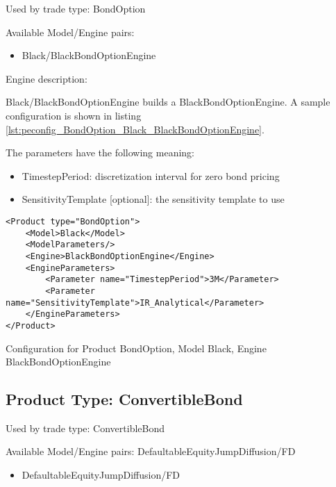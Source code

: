 Used by trade type: BondOption

Available Model/Engine pairs:

\begin{itemize}
\item Black/BlackBondOptionEngine
\end{itemize}

Engine description:

Black/BlackBondOptionEngine builds a BlackBondOptionEngine. A sample configuration is shown in listing
\ref{lst:peconfig_BondOption_Black_BlackBondOptionEngine}.

The parameters have the following meaning:

\begin{itemize}
\item TimestepPeriod: discretization interval for zero bond pricing
\item SensitivityTemplate [optional]: the sensitivity template to use 
\end{itemize}

\begin{longlisting}
\begin{verbatim}
<Product type="BondOption">
    <Model>Black</Model>
    <ModelParameters/>
    <Engine>BlackBondOptionEngine</Engine>
    <EngineParameters>
        <Parameter name="TimestepPeriod">3M</Parameter>
        <Parameter name="SensitivityTemplate">IR_Analytical</Parameter>
    </EngineParameters>
</Product>
\end{verbatim}
\caption{Configuration for Product BondOption, Model Black, Engine BlackBondOptionEngine}
\label{lst:peconfig_BondOption_Black_BlackBondOptionEngine}
\end{longlisting}

\subsection{Product Type: ConvertibleBond}

Used by trade type: ConvertibleBond

Available Model/Engine pairs: DefaultableEquityJumpDiffusion/FD

\begin{itemize}
\item DefaultableEquityJumpDiffusion/FD
\end{itemize}


